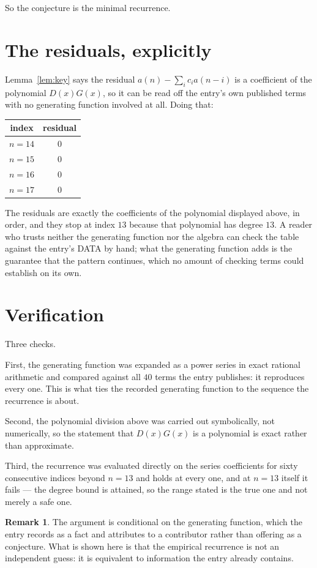 \documentclass[11pt,a4paper]{article}
\theoremstyle{plain}
\theoremstyle{definition}
\newtheorem{remark}[theorem]{Remark}
\begin{document}
So the conjecture is the minimal recurrence.

\section{The residuals, explicitly}

Lemma~\ref{lem:key} says the residual $a(n)-\sum_ic_ia(n-i)$ is a coefficient of the
polynomial $D(x)G(x)$, so it can be read off the entry's own published terms with no
generating function involved at all. Doing that:
\begin{center}
\begin{tabular}{cc}
index & residual \\ \hline
$n=14$ & $0$ \\
$n=15$ & $0$ \\
$n=16$ & $0$ \\
$n=17$ & $0$
\end{tabular}
\end{center}
The residuals are exactly the coefficients of the polynomial displayed above, in order, and
they stop at index $13$ because that polynomial has degree $13$. A reader who trusts
neither the generating function nor the algebra can check the table against the entry's DATA
by hand; what the generating function adds is the guarantee that the pattern continues, which
no amount of checking terms could establish on its own.

\section{Verification}

Three checks.

First, the generating function was expanded as a power series in exact rational arithmetic and
compared against all $40$ terms the entry publishes: it reproduces every one. This is
what ties the recorded generating function to the sequence the recurrence is about.

Second, the polynomial division above was carried out symbolically, not numerically, so the
statement that $D(x)G(x)$ is a polynomial is exact rather than approximate.

Third, the recurrence was evaluated directly on the series coefficients for sixty consecutive
indices beyond $n=13$ and holds at every one, and at $n=13$ itself it fails --- the
degree bound is attained, so the range stated is the true one and not merely a safe one.

\begin{remark}
The argument is conditional on the generating function, which the entry records as a fact and
attributes to a contributor rather than offering as a conjecture. What is shown here is that
the empirical recurrence is not an independent guess: it is equivalent to information the
entry already contains.
\end{remark}
\end{document}
